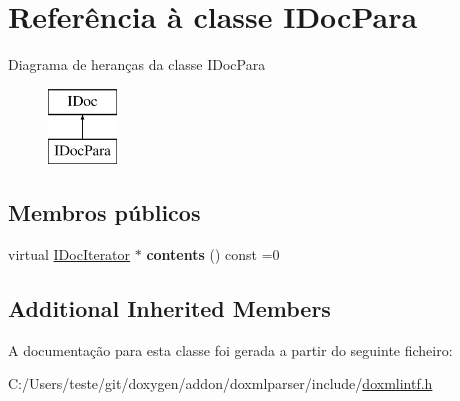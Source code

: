 \hypertarget{class_i_doc_para}{\section{Referência à classe I\-Doc\-Para}
\label{class_i_doc_para}
}
Diagrama de heranças da classe I\-Doc\-Para\begin{figure}[H]
\begin{center}
\leavevmode
\includegraphics[height=2.000000cm]{class_i_doc_para}
\end{center}
\end{figure}
\subsection*{Membros públicos}
\begin{DoxyCompactItemize}
\item 
\hypertarget{class_i_doc_para_aff89b69139ea695b04d666fe2c1f963b}{virtual \hyperlink{class_i_doc_iterator}{I\-Doc\-Iterator} $\ast$ {\bfseries contents} () const =0}\label{class_i_doc_para_aff89b69139ea695b04d666fe2c1f963b}

\end{DoxyCompactItemize}
\subsection*{Additional Inherited Members}


A documentação para esta classe foi gerada a partir do seguinte ficheiro\-:\begin{DoxyCompactItemize}
\item 
C\-:/\-Users/teste/git/doxygen/addon/doxmlparser/include/\hyperlink{include_2doxmlintf_8h}{doxmlintf.\-h}\end{DoxyCompactItemize}
